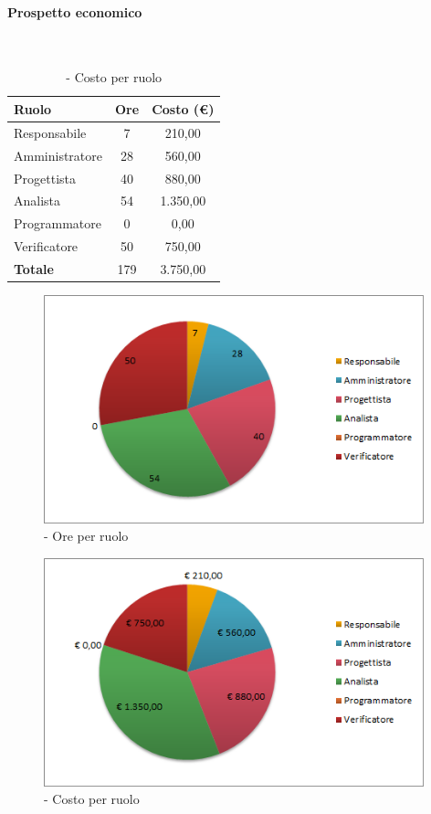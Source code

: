 \documentclass[./PianoDiProgetto.tex]{subfiles}
\begin{document}
	\paragraph{Prospetto economico}\

	\begin{table}[H]
		\centering

		\begin{tabular}{l * {2}{c}}
			\toprule
			\textbf{Ruolo} & \textbf{Ore} & \textbf{Costo (\euro{})} \\
			\midrule
			Responsabile & 7    & 210,00 \\
			Amministratore  & 28    & 560,00 \\
			Progettista  & 40    & 880,00 \\
			Analista & 54    & 1.350,00 \\
			Programmatore  & 0    & 0,00 \\
			Verificatore  & 50    & 750,00 \\
			\midrule
			\textbf{Totale}  & 179   & 3.750,00 \\
			\bottomrule
		\end{tabular}
		\caption{\PerPA{} - Costo per ruolo}
	\end{table}
\vfill

	\begin{figure}[H]
		\centering
		\includegraphics[width=11cm, trim=1cm 0cm 1cm 0cm]{grafici/Pa-ruolo}
			\caption{\PerPA{} - Ore per ruolo}
	\end{figure}
\vfill
\newpage
\vfill
	\begin{figure}[H]
		\centering
		\includegraphics[width=11cm, trim=1cm 0cm 1cm 0cm]{grafici/Pa-costo}
			\caption{\PerPA{} - Costo per ruolo}
	\end{figure}
\vfill
\end{document}
